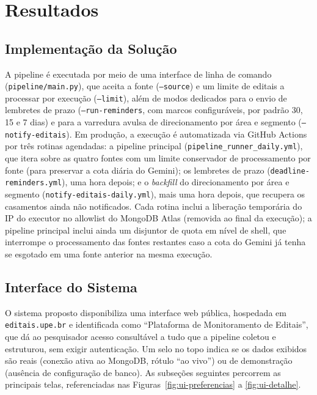 \documentclass[12pt]{article}
\begin{document}
  \section{Resultados}\label{sec:resultados}

  \subsection{Implementação da Solução}
  A pipeline é executada por meio de uma interface de linha de comando (\texttt{pipeline/main.py}), que aceita a fonte (\texttt{--source}) e um limite de editais a processar por execução (\texttt{--limit}), além de modos dedicados para o envio de lembretes de prazo (\texttt{--run-reminders}, com marcos configuráveis, por padrão 30, 15 e 7 dias) e para a varredura avulsa de direcionamento por área e segmento (\texttt{--notify-editais}). Em produção, a execução é automatizada via GitHub Actions por três rotinas agendadas: a pipeline principal (\texttt{pipeline\_runner\_daily.yml}), que itera sobre as quatro fontes com um limite conservador de processamento por fonte (para preservar a cota diária do Gemini); os lembretes de prazo (\texttt{deadline-reminders.yml}), uma hora depois; e o \emph{backfill} do direcionamento por área e segmento (\texttt{notify-editais-daily.yml}), mais uma hora depois, que recupera os casamentos ainda não notificados. Cada rotina inclui a liberação temporária do IP do executor no allowlist do MongoDB Atlas (removida ao final da execução); a pipeline principal inclui ainda um disjuntor de quota em nível de shell, que interrompe o processamento das fontes restantes caso a cota do Gemini já tenha se esgotado em uma fonte anterior na mesma execução.

  \subsection{Interface do Sistema}
  O sistema proposto disponibiliza uma interface web pública, hospedada em \texttt{editais.upe.br} e identificada como ``Plataforma de Monitoramento de Editais'', que dá ao pesquisador acesso consultável a tudo que a pipeline coletou e estruturou, sem exigir autenticação. Um selo no topo indica se os dados exibidos são reais (conexão ativa ao MongoDB, rótulo ``ao vivo'') ou de demonstração (ausência de configuração de banco). As subseções seguintes percorrem as principais telas, referenciadas nas Figuras~\ref{fig:ui-preferencias} a \ref{fig:ui-detalhe}.
\end{document}
